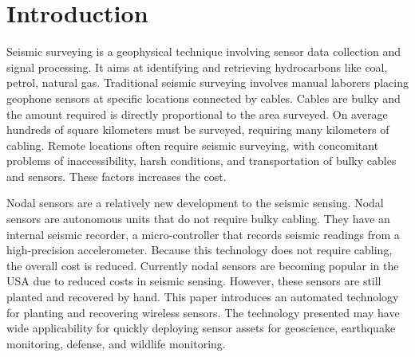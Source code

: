 \section{Introduction}\label{sec:Introduction}
Seismic surveying is a geophysical technique involving sensor data collection and signal processing. 
It aims at identifying and retrieving hydrocarbons like coal, petrol, natural gas. 
Traditional seismic surveying involves manual laborers placing geophone sensors at specific locations connected by cables. 
Cables are bulky and the amount required is directly proportional to the area surveyed. 
On average hundreds of square kilometers  must be surveyed, requiring many kilometers of cabling. 
Remote locations often require seismic surveying, with concomitant problems of inaccessibility, harsh  conditions, and  transportation of bulky cables and sensors.  
These factors increases the cost. 

  Nodal sensors are a relatively new development to the seismic sensing.
  Nodal sensors are autonomous units that do not require bulky cabling. 
  They have an internal seismic recorder, a micro-controller that records seismic readings from a high-precision accelerometer. 
  Because this technology does not require cabling, the overall cost is reduced. 
  Currently nodal sensors are becoming popular in the USA due to reduced costs in seismic sensing.
  However, these sensors are still planted and recovered by hand.  
  This paper introduces an automated technology for planting and recovering wireless sensors. 
  The technology presented may have wide applicability for quickly deploying sensor assets for geoscience, earthquake monitoring, defense, and  wildlife monitoring. 
  


